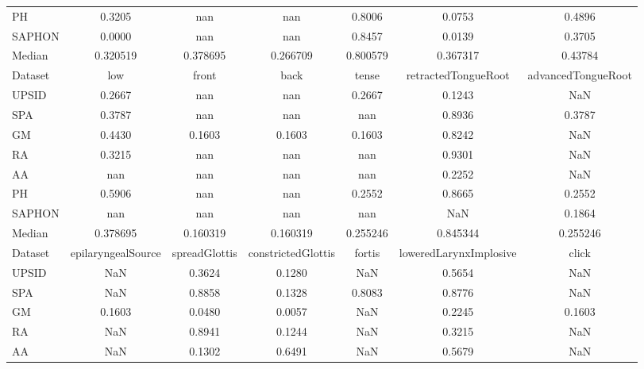 \documentclass[a4paper,12pt]{article}
\begin{document}
\begin{minipage}{\textwidth}
\begin{adjustbox}{max width=\textwidth}
\begin{tabular}{ | l | c c c c c c |}
    PH &    0.3205 &       nan &       nan &      0.8006 &      0.0753 &   0.4896 \\
    SAPHON &    0.0000 &       nan &       nan &      0.8457 &      0.0139 &   0.3705 \\
    \midrule
    Median &  0.320519 &  0.378695 &  0.266709 &    0.800579 &    0.367317 &  0.43784 \\
    \bottomrule
    \toprule
    Dataset &       low &     front &      back &     tense & retractedTongueRoot & advancedTongueRoot \\
    \midrule
    UPSID &    0.2667 &       nan &       nan &    0.2667 &              0.1243 &                NaN \\
    SPA &    0.3787 &       nan &       nan &       nan &              0.8936 &             0.3787 \\
    GM &    0.4430 &    0.1603 &    0.1603 &    0.1603 &              0.8242 &                NaN \\
    RA &    0.3215 &       nan &       nan &       nan &              0.9301 &                NaN \\
    AA &       nan &       nan &       nan &       nan &              0.2252 &                NaN \\
    PH &    0.5906 &       nan &       nan &    0.2552 &              0.8665 &             0.2552 \\
    SAPHON &       nan &       nan &       nan &       nan &                 NaN &             0.1864 \\
    \midrule
    Median &  0.378695 &  0.160319 &  0.160319 &  0.255246 &            0.845344 &           0.255246 \\
    \bottomrule
    \toprule
    Dataset & epilaryngealSource & spreadGlottis & constrictedGlottis &    fortis & loweredLarynxImplosive &     click \\
    \midrule
    UPSID &                NaN &        0.3624 &             0.1280 &       NaN &                 0.5654 &       NaN \\
    SPA &                NaN &        0.8858 &             0.1328 &    0.8083 &                 0.8776 &       NaN \\
    GM &             0.1603 &        0.0480 &             0.0057 &       NaN &                 0.2245 &    0.1603 \\
    RA &                NaN &        0.8941 &             0.1244 &       NaN &                 0.3215 &       NaN \\
    AA &                NaN &        0.1302 &             0.6491 &       NaN &                 0.5679 &       NaN \\

\end{tabular}
\end{adjustbox}
\end{minipage}
\end{document}
